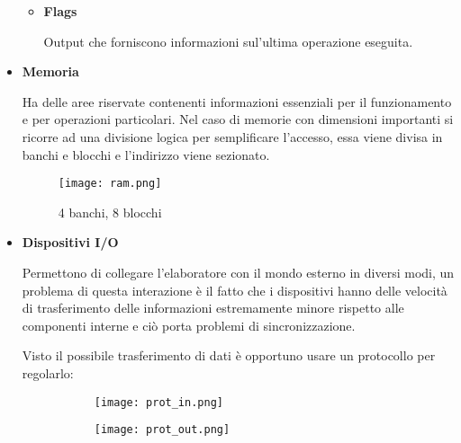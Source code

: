 \documentclass{article}
\begin{document}
\begin{itemize}
\begin{itemize}
        \item \textbf{Flags}

            Output che forniscono informazioni sul'ultima operazione eseguita.\newline
        
    \end{itemize}

    \item \textbf{Memoria}

        Ha delle aree riservate contenenti informazioni essenziali per il funzionamento e per operazioni particolari. Nel caso di memorie con dimensioni importanti si ricorre ad una divisione logica per semplificare l'accesso, essa viene divisa in banchi e blocchi e l'indirizzo viene sezionato.\newline

        \begin{figure}[ht]
            \centering
            \texttt{[image: ram.png]}
            \caption{4 banchi, 8 blocchi}
            \label{fig:ram}
        \end{figure}

    \item \textbf{Dispositivi I/O}

        Permettono di collegare l'elaboratore con il mondo esterno in diversi modi, un problema di questa interazione è il fatto che i dispositivi hanno delle velocità di trasferimento delle informazioni estremamente minore rispetto alle componenti interne e ciò porta problemi di sincronizzazione.\newline

        \newpage

        Visto il possibile trasferimento di dati è opportuno usare un protocollo per regolarlo:
        
\begin{figure}[ht]
    \begin{minipage}[t]{0.49\textwidth}
        \centering
        \begin{figure}[H]
        \centering
\texttt{[image: prot\_in.png]}
        \end{figure}
        \label{fig:p_in}
    \end{minipage}
    \begin{minipage}[t]{0.49\textwidth}
        \centering
        \begin{figure}[H]
        \centering
\texttt{[image: prot\_out.png]}
        \end{figure}
        \label{fig:p_out}
    \end{minipage}
\end{figure}


\end{itemize}
\end{document}

